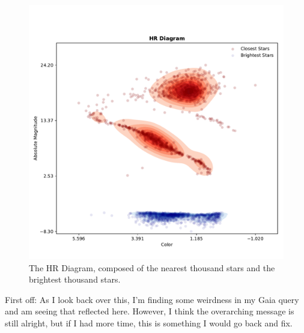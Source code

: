 \documentclass[12pt]{article}
\newenvironment{answer}[2][Answer]{\begin{trivlist}
\item[\hskip \labelsep {\bfseries #1}\hskip \labelsep {\bfseries #2.}]}{\end{trivlist}}
\begin{document}
\begin{answer}{3}



\begin{figure}[htp]
  \hspace*{\fill}%
  \includegraphics[width=\linewidth]{HR_diagram.pdf}\hfill%
  \hspace*{\fill}%
  \caption{The HR Diagram, composed of the nearest thousand stars and the brightest thousand stars.}
  \label{fig:HRD}
\end{figure}


First off: As I look back over this, I'm finding some weirdness in my Gaia query and am seeing that reflected here. However, I think the overarching message is still alright, but if I had more time, this is something I would go back and fix.


\end{answer}
\end{document}
